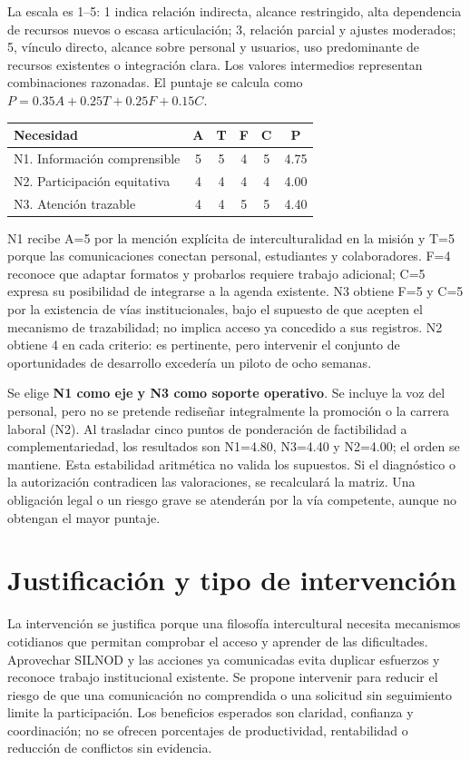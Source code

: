 \documentclass[12pt,letterpaper,oneside]{article}
\begin{document}
La escala es 1--5: 1 indica relación indirecta, alcance restringido, alta dependencia de recursos nuevos o escasa articulación; 3, relación parcial y ajustes moderados; 5, vínculo directo, alcance sobre personal y usuarios, uso predominante de recursos existentes o integración clara. Los valores intermedios representan combinaciones razonadas. El puntaje se calcula como $P=0.35A+0.25T+0.25F+0.15C$.

\begin{center}
\begin{tabularx}{\linewidth}{@{}Yccccc@{}}
\toprule \textbf{Necesidad} & \textbf{A} & \textbf{T} & \textbf{F} & \textbf{C} & \textbf{P} \\
\midrule
N1. Información comprensible & 5 & 5 & 4 & 5 & 4.75 \\
N2. Participación equitativa & 4 & 4 & 4 & 4 & 4.00 \\
N3. Atención trazable & 4 & 4 & 5 & 5 & 4.40 \\
\bottomrule
\end{tabularx}
\end{center}
N1 recibe A=5 por la mención explícita de interculturalidad en la misión y T=5 porque las comunicaciones conectan personal, estudiantes y colaboradores. F=4 reconoce que adaptar formatos y probarlos requiere trabajo adicional; C=5 expresa su posibilidad de integrarse a la agenda existente. N3 obtiene F=5 y C=5 por la existencia de vías institucionales, bajo el supuesto de que acepten el mecanismo de trazabilidad; no implica acceso ya concedido a sus registros. N2 obtiene 4 en cada criterio: es pertinente, pero intervenir el conjunto de oportunidades de desarrollo excedería un piloto de ocho semanas.

Se elige \textbf{N1 como eje y N3 como soporte operativo}. Se incluye la voz del personal, pero no se pretende rediseñar integralmente la promoción o la carrera laboral (N2). Al trasladar cinco puntos de ponderación de factibilidad a complementariedad, los resultados son N1=4.80, N3=4.40 y N2=4.00; el orden se mantiene. Esta estabilidad aritmética no valida los supuestos. Si el diagnóstico o la autorización contradicen las valoraciones, se recalculará la matriz. Una obligación legal o un riesgo grave se atenderán por la vía competente, aunque no obtengan el mayor puntaje.

\section{Justificación y tipo de intervención}
La intervención se justifica porque una filosofía intercultural necesita mecanismos cotidianos que permitan comprobar el acceso y aprender de las dificultades. Aprovechar SILNOD y las acciones ya comunicadas evita duplicar esfuerzos y reconoce trabajo institucional existente. Se propone intervenir para reducir el riesgo de que una comunicación no comprendida o una solicitud sin seguimiento limite la participación. Los beneficios esperados son claridad, confianza y coordinación; no se ofrecen porcentajes de productividad, rentabilidad o reducción de conflictos sin evidencia.
\end{document}
